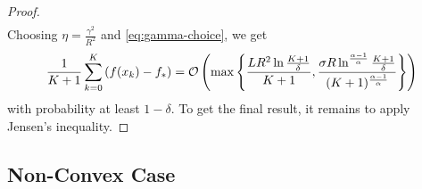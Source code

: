 \documentclass{article}
\begin{document}
\begin{proof}
\begin{align*}
    \end{align*}
     Choosing $\eta = \frac{\gamma^2}{R^2}$ and  \eqref{eq:gamma-choice}, we get 
    \begin{align*}
    \frac{1}{K+1}\sum\limits_{k=0}^{K}\left(f(x_k) - f_*\right) = {\cal O}\left(\max\left\{\frac{LR^2 \ln\frac{K+1}{\delta}}{K+1}, \frac{\sigma R \ln^{\frac{\alpha-1}{\alpha}}\frac{K+1}{\delta}}{(K+1)^\frac{\alpha-1}{\alpha}}\right\}\right)
    \end{align*}
    with probability at least $1 - \delta$. To get the final result, it remains to apply Jensen's inequality.
\end{proof}



\subsection{Non-Convex Case}
\end{document}
